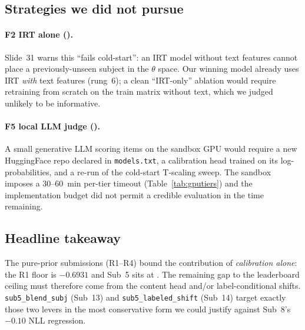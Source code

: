 \subsection{Strategies we did not pursue}
\label{sec:ablations-skipped}

\paragraph{F2 IRT alone ().}
Slide~31 warns this ``fails cold-start'': an IRT model without text
features cannot place a previously-unseen subject in the $\theta$
space. Our winning model already uses IRT \emph{with} text features
(rung~6); a clean ``IRT-only'' ablation would require retraining
from scratch on the train matrix without text, which we judged
unlikely to be informative.

\paragraph{F5 local LLM judge ().}
A small generative LLM scoring items on the sandbox GPU would
require a new HuggingFace repo declared in \texttt{models.txt}, a
calibration head trained on its log-probabilities, and a re-run of
the cold-start T-scaling sweep. The sandbox imposes a 30--60~min
per-tier timeout (Table~\ref{tab:gputiers}) and the implementation
budget did not permit a credible evaluation in the time remaining.

\subsection{Headline takeaway}

The pure-prior submissions (R1--R4) bound the contribution of
\emph{calibration alone}: the R1 floor is $-0.6931$ and Sub~5 sits at
\lbNLLsubFive. The remaining gap to the leaderboard ceiling
must therefore come from the content head and/or label-conditional
shifts. \texttt{sub5\_blend\_subj} (Sub~13) and
\texttt{sub5\_labeled\_shift} (Sub~14) target exactly those two
levers in the most conservative form we could justify against Sub~8's
$-0.10$ NLL regression.
